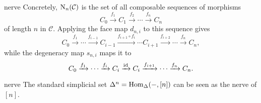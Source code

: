 \begin{example}{nerve}
    Concretely, $\textup{N}_n(\mathcal{C})$ is the set of all composable sequences of morphisms
    \[ C_0 \xrightarrow{f_1} C_1 \xrightarrow{f_2} \cdots \xrightarrow{f_n} C_n \]
    of length $n$ in $\mathcal{C}$. Applying the face map $d_{n, i}$ to this sequence gives
    \[ C_0 \xrightarrow{f_1} \cdots \xrightarrow{f_{i - 1}} C_{i - 1} \xrightarrow{f_{i + 1} \circ f_i} \cdots C_{i + 1} \xrightarrow{f_{i + 2}} \cdots \xrightarrow{f_n} C_n , \]
    while the degeneracy map $s_{n, i}$ maps it to
    \[ C_0 \xrightarrow{f_1} \cdots \xrightarrow{f_i} C_i \xrightarrow{\textup{id}} C_i \xrightarrow{f_{i + 1}} \cdots \xrightarrow{f_n} C_n . \]
\end{example}

\begin{example}{nerve}
    The standard simplicial set $\Delta^n = \operatorname{Hom}_\Delta(-, [n])$ can be seen as the nerve of $[n]$.
\end{example}

